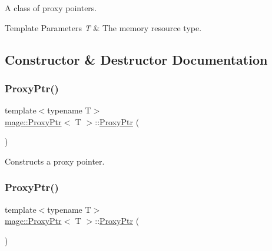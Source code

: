 A class of proxy pointers.


\begin{DoxyTemplParams}{Template Parameters}
{\em T} & The memory resource type. \\
\hline
\end{DoxyTemplParams}


\subsection{Constructor \& Destructor Documentation}
\hypertarget{classmage_1_1_proxy_ptr_a6fadf61cdc71e1d6bc9ac666eda5d2c6}{}\label{classmage_1_1_proxy_ptr_a6fadf61cdc71e1d6bc9ac666eda5d2c6} 
\subsubsection{\texorpdfstring{Proxy\+Ptr()}{ProxyPtr()}\hspace{0.1cm}{\footnotesize\ttfamily [1/8]}}
{\footnotesize\ttfamily template$<$typename T$>$ \\
\hyperlink{classmage_1_1_proxy_ptr}{mage\+::\+Proxy\+Ptr}$<$ T $>$\+::\hyperlink{classmage_1_1_proxy_ptr}{Proxy\+Ptr} (\begin{DoxyParamCaption}{ }\end{DoxyParamCaption})\hspace{0.3cm}{\ttfamily [noexcept]}}

Constructs a proxy pointer. \hypertarget{classmage_1_1_proxy_ptr_aaad9140d67d5c0a8694e94973234676a}{}\label{classmage_1_1_proxy_ptr_aaad9140d67d5c0a8694e94973234676a} 
\subsubsection{\texorpdfstring{Proxy\+Ptr()}{ProxyPtr()}\hspace{0.1cm}{\footnotesize\ttfamily [2/8]}}
{\footnotesize\ttfamily template$<$typename T$>$ \\
\hyperlink{classmage_1_1_proxy_ptr}{mage\+::\+Proxy\+Ptr}$<$ T $>$\+::\hyperlink{classmage_1_1_proxy_ptr}{Proxy\+Ptr} (\begin{DoxyParamCaption}\item[{std\+::nullptr\+\_\+t}]{ }\end{DoxyParamCaption})\hspace{0.3cm}{\ttfamily [noexcept]}}

